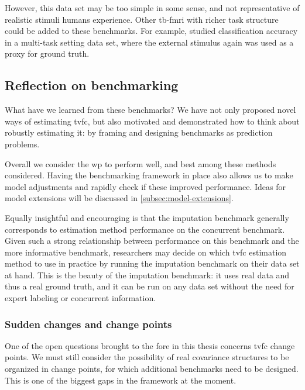 However, this data set may be too simple in some sense, and not representative of realistic stimuli humans experience.
Other \gls{tb-fmri} with richer task structure could be added to these benchmarks.
For example, \textcite{Xie2019} studied classification accuracy in a multi-task setting data set, where the external stimulus again was used as a proxy for ground truth.

\subsection{Reflection on benchmarking}
\label{subsec:benchmarking-reflection}

What have we learned from these benchmarks?
%
We have not only proposed novel ways of estimating \gls{tvfc}, but also motivated and demonstrated how to think about robustly estimating it: by framing and designing benchmarks as prediction problems.

Overall we consider the \gls{wp} to perform well, and best among these methods considered.
%
Having the benchmarking framework in place also allows us to make model adjustments and rapidly check if these improved performance.
Ideas for model extensions will be discussed in \cref{subsec:model-extensions}.

Equally insightful and encouraging is that the imputation benchmark generally corresponds to estimation method performance on the concurrent benchmark.
Given such a strong relationship between performance on this benchmark and the more informative benchmark, researchers may decide on which \gls{tvfc} estimation method to use in practice by running the imputation benchmark on their data set at hand.
This is the beauty of the imputation benchmark: it uses real data and thus a real ground truth, and it can be run on any data set without the need for expert labeling or concurrent information.

\subsubsection{Sudden changes and change points}
\label{subsec:sudden-changes}

One of the open questions brought to the fore in this thesis concerns \gls{tvfc} change points.
We must still consider the possibility of real covariance structures to be organized in change points, for which additional benchmarks need to be designed.
This is one of the biggest gaps in the framework at the moment.

